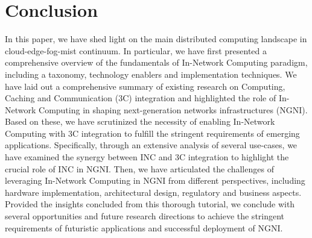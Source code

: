\section{Conclusion }
\noindent In this paper, we have shed light on the main distributed computing landscape in cloud-edge-fog-mist continuum. In particular, we have first presented a comprehensive overview of the fundamentals of In-Network Computing paradigm, including a taxonomy, technology enablers and implementation techniques. We have laid out a comprehensive summary of existing research on Computing, Caching and Communication (3C) integration and highlighted the role of In-Network Computing in shaping next-generation networks infrastructures (NGNI). 	
Based on these, we have scrutinized the necessity of enabling In-Network Computing with 3C integration to fulfill the stringent requirements of emerging applications. Specifically, through an extensive analysis of several use-cases, we have examined the synergy between INC and 3C integration to highlight the crucial role of INC in NGNI. Then, we have articulated the challenges of leveraging In-Network Computing in NGNI from different perspectives, including hardware implementation, architectural design, regulatory and business aspects.
Provided the insights concluded from this thorough tutorial, we conclude with several opportunities and future research directions to achieve the stringent requirements of futuristic applications and successful deployment of NGNI.  